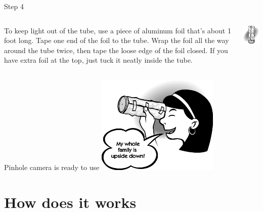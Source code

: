 \begin{frame}{Step 4}
  \begin{columns}
    \begin{column}{0.6\textwidth}
To keep light out of the tube, use a piece of aluminum foil that's about 1 foot long. Tape one end of the foil to the tube. Wrap the foil all the way around the tube twice, then tape the loose edge of the foil closed. If you have extra foil at the top, just tuck it neatly inside the tube.
    \end{column}
    \begin{column}{0.4\textwidth}
      \includegraphics{media/can_cover.png}
    \end{column}
  \end{columns}
\end{frame}

\begin{frame}{Pinhole camera is ready to use}
  \includegraphics{media/girl_looks.png}
\end{frame}

\section{How does it works}
\begin{frame}{}
  
\end{frame}


